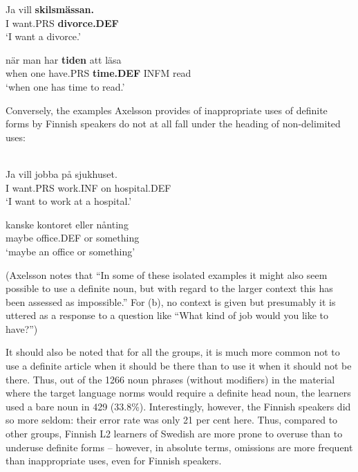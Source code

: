 \z

\ea
\gll Ja  vill  \textbf{skilsmässan.}\\
I  want.PRS  \textbf{divorce.DEF}\\
\glt  ‘I want a divorce.’

\z

\ea
\gll när  man  har  \textbf{tiden} att  läsa  \\
when  one  have.PRS  \textbf{time.DEF} INFM  read  \\
\glt ‘when one has time to read.’

\z

Conversely, the examples Axelsson provides of inappropriate uses of definite forms by Finnish speakers do not at all fall under the heading of non-delimited uses:


\ea\label{}
\\
\gll Ja  vill  jobba  på  sjukhuset.\\
I  want.PRS  work.INF  on  hospital.DEF\\
\glt ‘I want to work at a hospital.’

\z

\ea
\gll kanske  kontoret  eller  nånting\\
maybe  office.DEF  or  something\\
\glt ‘maybe an office or something’ 

\z

(Axelsson notes that “In some of these isolated examples it might also seem possible to use a definite noun, but with regard to the larger context this has been assessed as impossible.” For (b), no context is given but presumably it is uttered as a response to a question like “What kind of job would you like to have?”)

It should also be noted that for all the groups, it is much more common not to use a definite article when it should be there than to use it when it should not be there. Thus, out of the 1266 noun phrases (without modifiers) in the material where the target language norms would require a definite head noun, the learners used a bare noun in 429 (33.8\%). Interestingly, however, the Finnish speakers did so more seldom: their error rate was only 21 per cent here. Thus, compared to other groups, Finnish L2 learners of Swedish are more prone to overuse than to underuse definite forms – however, in absolute terms, omissions are more frequent than inappropriate uses, even for Finnish speakers.  

